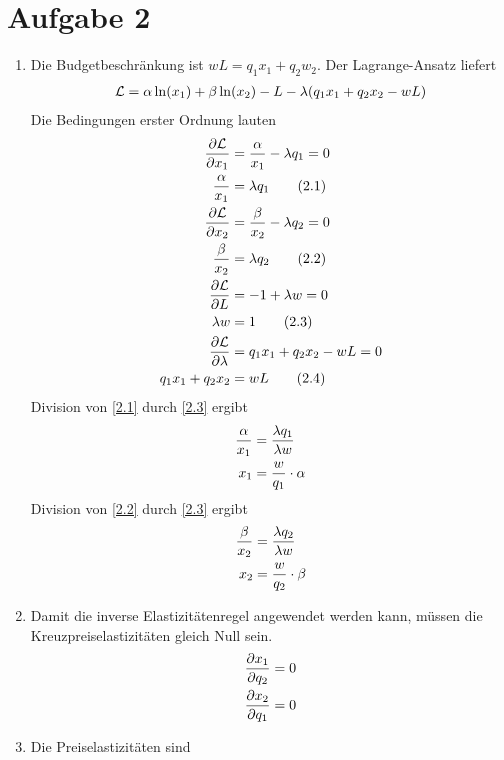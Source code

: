 \documentclass{article}
\begin{document}
	\section*{Aufgabe 2}
	\begin{enumerate}[label=(\alph*)]
		\item Die Budgetbeschränkung ist $wL=q_1x_1+q_2w_2$. Der Lagrange-Ansatz liefert
		\begin{align}
			\mathcal{L} = \alpha\ln(x_1) + \beta\ln(x_2)-L-\lambda(q_1x_1+q_2x_2-wL) \notag
		\end{align}
		Die Bedingungen erster Ordnung lauten
		\begin{align}
			\frac{\partial\mathcal{L}}{\partial x_1} &= \frac{\alpha}{x_1} - \lambda q_1 = 0 \notag \\
			\label{2.1}
			\frac{\alpha}{x_1} &= \lambda q_1 \tag{2.1} \\
			\frac{\partial\mathcal{L}}{\partial x_2} &= \frac{\beta}{x_2} - \lambda q_2 = 0 \notag \\
			\label{2.2}
			\frac{\beta}{x_2} &= \lambda q_2 \tag{2.2} \\
			\frac{\partial\mathcal{L}}{\partial L} &= -1 + \lambda w = 0 \notag \\
			\label{2.3}
			\lambda w &= 1 \tag{2.3} \\
			\frac{\partial\mathcal{L}}{\partial\lambda} &= q_1x_1+q_2x_2 - wL = 0 \notag \\
			\label{2.4}
			q_1x_1+q_2x_2 &= wL \tag{2.4}
		\end{align}
		Division von \eqref{2.1} durch \eqref{2.3} ergibt
		\begin{align}
			\frac{\alpha}{x_1} &= \frac{\lambda q_1}{\lambda w} \notag \\
			x_1 &= \frac{w}{q_1}\cdot\alpha \notag
		\end{align}
		Division von \eqref{2.2} durch \eqref{2.3} ergibt
		\begin{align}
			\frac{\beta}{x_2} &= \frac{\lambda q_2}{\lambda w} \notag \\
			x_2 &= \frac{w}{q_2}\cdot\beta \notag
		\end{align}
		\item Damit die inverse Elastizitätenregel angewendet werden kann, müssen die Kreuzpreiselastizitäten gleich Null sein.
		\begin{align}
			\frac{\partial x_1}{\partial q_2} &= 0 \notag \\
			\frac{\partial x_2}{\partial q_1} &= 0 \notag
		\end{align}
		\item Die Preiselastizitäten sind

\end{enumerate}
\end{document}
